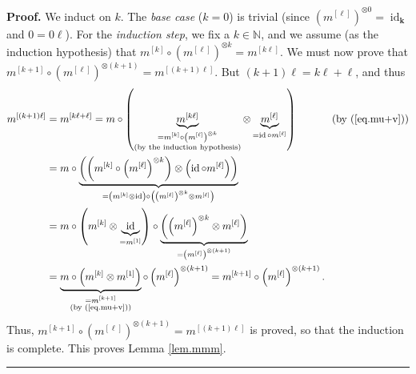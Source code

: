 \documentclass[numbers=enddot,12pt,final,onecolumn,notitlepage]{scrartcl}%
\theoremstyle{definition}
\newenvironment{proof}[1][Proof]{\noindent\textbf{#1.} }{\ \rule{0.5em}{0.5em}}
\begin{document}
\begin{proof}
We induct on $k$. The \textit{base case} ($k=0$) is trivial (since $\left(
m^{\left[  \ell\right]  }\right)  ^{\otimes0}=\operatorname*{id}%
\nolimits_{\mathbf{k}}$ and $0=0\ell$). For the \textit{induction step}, we
fix a $k\in\mathbb{N}$, and we assume (as the induction hypothesis) that
$m^{\left[  k\right]  }\circ\left(  m^{\left[  \ell\right]  }\right)
^{\otimes k}=m^{\left[  k\ell\right]  }$. We must now prove that $m^{\left[
k+1\right]  }\circ\left(  m^{\left[  \ell\right]  }\right)  ^{\otimes\left(
k+1\right)  }=m^{\left[  \left(  k+1\right)  \ell\right]  }$. But $\left(
k+1\right)  \ell=k\ell+\ell$, and thus%
\begin{align*}
m^{\left[  \left(  k+1\right)  \ell\right]  }  &  =m^{\left[  k\ell
+\ell\right]  }=m\circ\left(  \underbrace{m^{\left[  k\ell\right]  }%
}_{\substack{=m^{\left[  k\right]  }\circ\left(  m^{\left[  \ell\right]
}\right)  ^{\otimes k}\\\text{(by the induction hypothesis)}}}\otimes
\underbrace{m^{\left[  \ell\right]  }}_{=\operatorname*{id}\circ m^{\left[
\ell\right]  }}\right)  \ \ \ \ \ \ \ \ \ \ \left(  \text{by (\ref{eq.mu+v}%
)}\right) \\
&  =m\circ\underbrace{\left(  \left(  m^{\left[  k\right]  }\circ\left(
m^{\left[  \ell\right]  }\right)  ^{\otimes k}\right)  \otimes\left(
\operatorname*{id}\circ m^{\left[  \ell\right]  }\right)  \right)  }_{=\left(
m^{\left[  k\right]  }\otimes\operatorname*{id}\right)  \circ\left(  \left(
m^{\left[  \ell\right]  }\right)  ^{\otimes k}\otimes m^{\left[  \ell\right]
}\right)  }\\
&  =m\circ\left(  m^{\left[  k\right]  }\otimes\underbrace{\operatorname*{id}%
}_{=m^{\left[  1\right]  }}\right)  \circ\underbrace{\left(  \left(
m^{\left[  \ell\right]  }\right)  ^{\otimes k}\otimes m^{\left[  \ell\right]
}\right)  }_{=\left(  m^{\left[  \ell\right]  }\right)  ^{\otimes\left(
k+1\right)  }}\\
&  =\underbrace{m\circ\left(  m^{\left[  k\right]  }\otimes m^{\left[
1\right]  }\right)  }_{\substack{=m^{\left[  k+1\right]  }\\\text{(by
(\ref{eq.mu+v}))}}}\circ\left(  m^{\left[  \ell\right]  }\right)
^{\otimes\left(  k+1\right)  }=m^{\left[  k+1\right]  }\circ\left(  m^{\left[
\ell\right]  }\right)  ^{\otimes\left(  k+1\right)  }.
\end{align*}
Thus, $m^{\left[  k+1\right]  }\circ\left(  m^{\left[  \ell\right]  }\right)
^{\otimes\left(  k+1\right)  }=m^{\left[  \left(  k+1\right)  \ell\right]  }$
is proved, so that the induction is complete. This proves Lemma \ref{lem.mmm}.
\end{proof}
\end{document}
